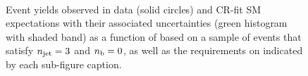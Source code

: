 \begin{figure}[h!]
\begin{center}
    \\
    \caption{Event yields observed in data (solid circles) and CR-fit SM expectations with their associated uncertainties (green histogram with shaded band) as a function of \HTmiss based on a sample of events that satisfy $n_{\text{jet}} = 3$ and $n_{\text{b}} = 0$, as well as the requirements on \scalht indicated by each sub-figure caption. }
    \label{fig:mhtval_eq3j_eq0b}
  \end{center}
\end{figure}

